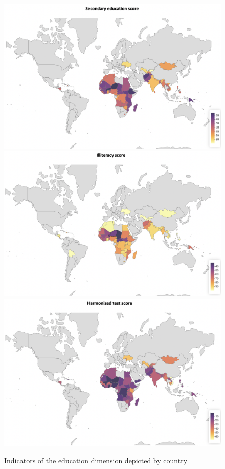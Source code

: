 \documentclass[
  a4paper, twoside, 12pt]{book}
\begin{document}
\begin{figure}[H]

{\centering \includegraphics[width=0.69\linewidth,]{figures/maps/secondaryeduc_total} \includegraphics[width=0.69\linewidth,]{figures/maps/illiteracy_total} \includegraphics[width=0.69\linewidth,]{figures/maps/harmonizedtest_total} 

}

\caption{Indicators of the education dimension depicted by country}\label{fig:fig-educationmap}
\end{figure}
\end{document}
